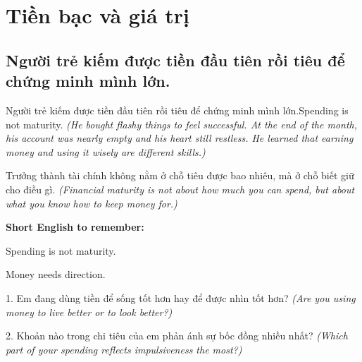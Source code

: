 \chapter{Tiền bạc và giá trị}

\section{Người trẻ kiếm được tiền đầu tiên rồi tiêu để chứng minh mình lớn.}
\begin{truyen}{Người trẻ kiếm được tiền đầu tiên rồi tiêu để chứng minh mình lớn.}{Spending is not maturity.}
\textit{(He bought flashy things to feel successful. At the end of the month, his account was nearly empty and his heart still restless. He learned that earning money and using it wisely are different skills.)}
\end{truyen}
\begin{baihoc}
Trưởng thành tài chính không nằm ở chỗ tiêu được bao nhiêu, mà ở chỗ biết giữ cho điều gì.
\textit{(Financial maturity is not about how much you can spend, but about what you know how to keep money for.)}
\end{baihoc}
\begin{ghinhoanh}
\textbf{Short English to remember:}

Spending is not maturity.

Money needs direction.
\end{ghinhoanh}
\begin{tuhocnhanh}
1. Em đang dùng tiền để sống tốt hơn hay để được nhìn tốt hơn? \textit{(Are you using money to live better or to look better?)}

2. Khoản nào trong chi tiêu của em phản ánh sự bốc đồng nhiều nhất? \textit{(Which part of your spending reflects impulsiveness the most?)}
\end{tuhocnhanh}
\ngancach

